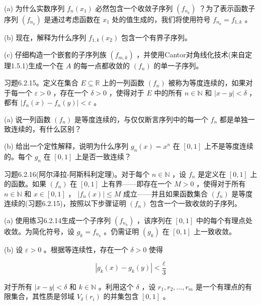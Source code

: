(a) 为什么实数序列 \({f}_{n}\left( {x}_{1}\right)\) 必然包含一个收敛子序列 \(\left( {f}_{{n}_{k}}\right)\) ？为了表示函数子序列 \(\left( {f}_{{n}_{k}}\right)\) 是通过考虑函数在 \({x}_{1}\) 处的值生成的，我们将使用符号 \({f}_{{n}_{k}} = {f}_{1,k}\) 。

(b) 现在，解释为什么序列 \({f}_{1,k}\left( {x}_{2}\right)\) 包含一个有界子序列。

(c) 仔细构造一个嵌套的子序列族 \(\left( {f}_{m,k}\right)\) ，并使用Cantor对角线化技术(来自定理1.5.1)生成一个在 \(A\) 的每一点都收敛的 \(\left( {f}_{n}\right)\) 的单一子序列。

习题6.2.15。定义在集合 \(E \subseteq  \mathbb{R}\) 上的一列函数 \(\left( {f}_{n}\right)\) 被称为等度连续的，如果对于每一个 \(\varepsilon  > 0\) ，存在一个 \(\delta  > 0\) ，使得对于 \(E\) 中的所有 \(n \in  \mathbb{N}\) 和 \(\left| {x - y}\right|  < \delta\) ，都有 \(\left| {{f}_{n}\left( x\right)  - {f}_{n}\left( y\right) }\right|  < \varepsilon\) 。

(a) 说一列函数 \(\left( {f}_{n}\right)\) 是等度连续的，与仅仅断言序列中的每一个 \({f}_{n}\) 都是单独一致连续的，有什么区别？

(b) 给出一个定性解释，说明为什么序列 \({g}_{n}\left( x\right)  = {x}^{n}\) 在 \(\left\lbrack  {0,1}\right\rbrack\) 上不是等度连续的。每个 \({g}_{n}\) 在 \(\left\lbrack  {0,1}\right\rbrack\) 上是否一致连续？

习题6.2.16(阿尔泽拉-阿斯科利定理)。对于每个 \(n \in  \mathbb{N}\) ，设 \({f}_{n}\) 是定义在 \(\left\lbrack  {0,1}\right\rbrack\) 上的函数。如果 \(\left( {f}_{n}\right)\) 在 \(\left\lbrack  {0,1}\right\rbrack\) 上有界——即存在一个 \(M > 0\) ，使得对于所有 \(n \in  \mathbb{N}\) 和 \(x \in  \left\lbrack  {0,1}\right\rbrack\) ， \(\left| {{f}_{n}\left( x\right) }\right|  \leq  M\) 成立——并且如果函数集合 \(\left( {f}_{n}\right)\) 是等度连续的(习题6.2.15)，按照以下步骤证明 \(\left( {f}_{n}\right)\) 包含一个一致收敛的子序列。

(a) 使用练习6.2.14生成一个子序列 \(\left( {f}_{{n}_{k}}\right)\) ，该序列在 \(\left\lbrack  {0,1}\right\rbrack\) 中的每个有理点处收敛。为简化符号，设 \({g}_{k} = {f}_{{n}_{k}}\) 。仍需证明 \(\left( {g}_{k}\right)\) 在 \(\left\lbrack  {0,1}\right\rbrack\) 上一致收敛。

(b) 设 \(\varepsilon  > 0\) 。根据等连续性，存在一个 \(\delta  > 0\) 使得

\[
\left| {{g}_{k}\left( x\right)  - {g}_{k}\left( y\right) }\right|  < \frac{\varepsilon }{3}
\]

对于所有 \(\left| {x - y}\right|  < \delta\) 和 \(k \in  \mathbb{N}\) 。利用这个 \(\delta\) ，设 \({r}_{1},{r}_{2},\ldots ,{r}_{m}\) 是一个有理点的有限集合，其性质是邻域 \({V}_{\delta }\left( {r}_{i}\right)\) 的并集包含 \(\left\lbrack  {0,1}\right\rbrack\) 。


